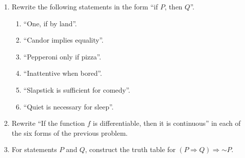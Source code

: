 \documentclass[12pt]{article}
\newcommand{\lsim}{\mathord{\sim}}  %
\begin{document}
\begin{enumerate}
\item  Rewrite the following statements in the form ``if $P$, then $Q$''.
  \begin{enumerate}

    \item ``One, if by land''.
    \item ``Candor implies equality''.
    \item ``Pepperoni only if pizza''.
    \item ``Inattentive when bored''.
    \item ``Slapstick is sufficient for comedy''.
    \item ``Quiet is necessary for sleep''.

  \end{enumerate}

\item Rewrite ``If the function $f$ is differentiable, then it is continuous'' in each of the six forms of the previous problem.

\item For statements $P$ and $Q$, construct the truth table for $(P\Rightarrow Q) \Rightarrow \lsim P$.

  
\end{enumerate}  
\end{document}
